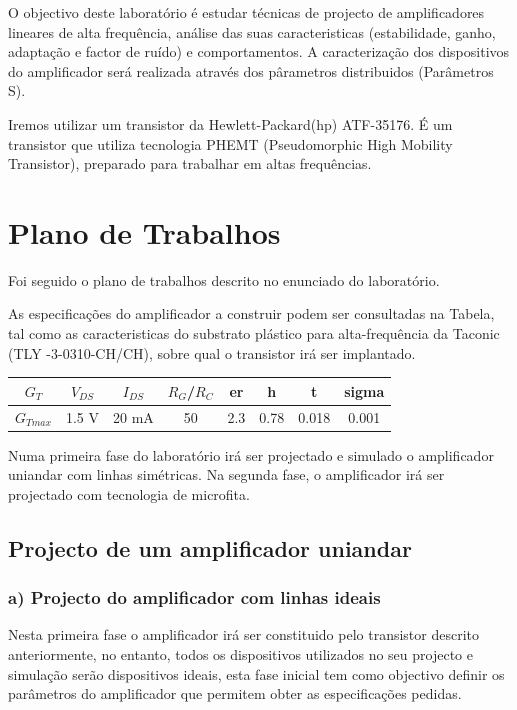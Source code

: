 \documentclass[11pt]{article}
\numberwithin{equation}{section}
\begin{document}
O objectivo deste laboratório é estudar técnicas de projecto de amplificadores lineares de alta frequência, análise das suas caracteristicas (estabilidade, ganho, adaptação e factor de ruído) e comportamentos. A caracterização dos dispositivos do amplificador será realizada através dos pârametros distribuidos (Parâmetros S).

Iremos utilizar um transistor da Hewlett-Packard(hp) ATF-35176. É um transistor que utiliza tecnologia PHEMT (Pseudomorphic High Mobility Transistor), preparado para trabalhar em altas frequências.

\section{Plano de Trabalhos}

Foi seguido o plano de trabalhos descrito no enunciado do laboratório.

As especificações do amplificador a construir podem ser consultadas na Tabela, tal como as caracteristicas do substrato plástico para alta-frequência da Taconic (TLY -3-0310-CH/CH), sobre qual o transistor irá ser implantado. 

\begin{tabular}{|c|c|c|c|c|c|c|c|}
	\hline  $ G_{T} $ & $ V_{DS} $ & $ I_{DS} $ & $ R_{G} $/$ R_{C} $ & er & h & t & sigma  \\ 
	\hline  $ G_{Tmax} $ & 1.5 V & 20 mA & 50 & 2.3 & 0.78 & 0.018 & 0.001  \\ 
	\hline 
\end{tabular} 


Numa primeira fase do laboratório irá ser projectado e simulado o amplificador uniandar com linhas simétricas. Na segunda fase, o amplificador irá ser projectado com tecnologia de microfita.

\subsection{Projecto de um amplificador uniandar}

\subsubsection{a) Projecto do amplificador com linhas ideais}

Nesta primeira fase o amplificador irá ser constituido pelo transistor descrito anteriormente, no entanto, todos os dispositivos utilizados no seu projecto e simulação serão dispositivos ideais, esta fase inicial tem como objectivo definir os parâmetros do amplificador que permitem obter as especificações pedidas.
\end{document}
